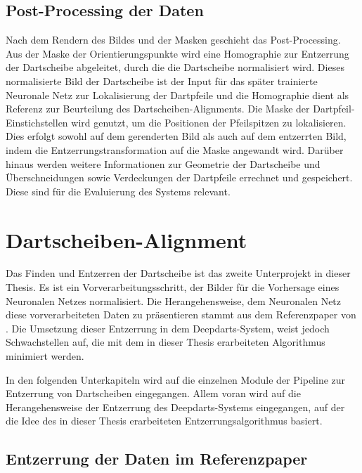 \subsection{Post-Processing der Daten}
\label{sec:impl:daten:postprocess}

Nach dem Rendern des Bildes und der Masken geschieht das Post-Processing. Aus der Maske der Orientierungspunkte wird eine Homographie zur Entzerrung der Dartscheibe abgeleitet, durch die die Dartscheibe normalisiert wird. Dieses normalisierte Bild der Dartscheibe ist der Input für das später trainierte Neuronale Netz zur Lokalisierung der Dartpfeile und die Homographie dient als Referenz zur Beurteilung des Dartscheiben-Alignments. Die Maske der Dartpfeil-Einstichstellen wird genutzt, um die Positionen der Pfeilspitzen zu lokalisieren. Dies erfolgt sowohl auf dem gerenderten Bild als auch auf dem entzerrten Bild, indem die Entzerrungstransformation auf die Maske angewandt wird. Darüber hinaus werden weitere Informationen zur Geometrie der Dartscheibe und Überschneidungen sowie Verdeckungen der Dartpfeile errechnet und gespeichert. Diese sind für die Evaluierung des Systems relevant.


\section{Dartscheiben-Alignment}
\label{sec:impl:cv}

Das Finden und Entzerren der Dartscheibe ist das zweite Unterprojekt in dieser Thesis. Es ist ein Vorverarbeitungsschritt, der Bilder für die Vorhersage eines Neuronalen Netzes normalisiert. Die Herangehensweise, dem Neuronalen Netz diese vorverarbeiteten Daten zu präsentieren stammt aus dem Referenzpaper von \citeauthor{deepdarts} \cite{deepdarts}. Die Umsetzung dieser Entzerrung in dem Deepdarts-System, weist jedoch Schwachstellen auf, die mit dem in dieser Thesis erarbeiteten Algorithmus minimiert werden.

In den folgenden Unterkapiteln wird auf die einzelnen Module der Pipeline zur Entzerrung von Dartscheiben eingegangen. Allem voran wird auf die Herangehensweise der Entzerrung des Deepdarts-Systems eingegangen, auf der die Idee des in dieser Thesis erarbeiteten Entzerrungsalgorithmus basiert.

\subsection{Entzerrung der Daten im Referenzpaper}
\label{sec:impl:cv:paper}

